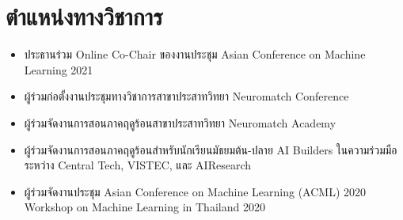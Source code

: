 \section{\sc ตำแหน่งทางวิชาการ}

\begin{itemize}[leftmargin=0cm, label={}]
\itemsep0em

\item ประธานร่วม Online Co-Chair ของงานประชุม Asian Conference on Machine Learning 2021

\item ผู้ร่วมก่อตั้งงานประชุมทางวิชาการสาขาประสาทวิทยา Neuromatch Conference

\item ผู้ร่วมจัดงานการสอนภาคฤดูร้อนสาขาประสาทวิทยา Neuromatch Academy

\item ผู้ร่วมจัดงานการสอนภาคฤดูร้อนสำหรับนักเรียนมัธยมต้น-ปลาย AI Builders ในความร่วมมือระหว่าง Central Tech, VISTEC, และ AIResearch

\item ผู้ร่วมจัดงานประชุม Asian Conference on Machine Learning (ACML) 2020 Workshop on Machine Learning in Thailand 2020

\end{itemize}
